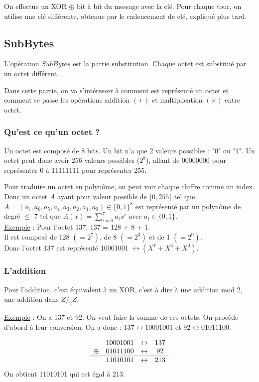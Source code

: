 On effectue un XOR $\oplus$ bit à bit du message avec la clé.
Pour chaque tour, on utilise une clé différente, obtenue par le cadencement de clé, expliqué plus tard.

\subsection{SubBytes}
L'opération $SubBytes$ est la partie substitution. Chaque octet est substitué par un octet différent. 

Dans cette partie, on va s'intéresser à comment est représenté un octet et comment se passe les opérations addition $(+)$ et multiplication $(\times)$ entre octet.

\subsubsection{Qu'est ce qu'un octet ?}
Un octet est composé de 8 bits. Un bit n'a que 2 valeurs possibles : "0" ou "1". Un octet peut donc avoir 256 valeurs possibles ($2^8$), allant de $00000000$ pour représenter 0 à $11111111$ pour représenter 255. 

Pour traduire un octet en polynôme, on peut voir chaque chiffre comme un index. 
Donc un octet $A$ ayant pour valeur possible de $\llbracket 0, 255 \rrbracket$ tel que $A = (a_7,a_6,a_5,a_4,a_3,a_2,a_1,a_0)\in\{0,1\}^8$ est représenté par un polynôme de degré $\leq$ 7 tel que $A(x) = \sum_{i=0}^7 a_i x^i$ avec $a_i\in \{0,1\}$. \\

\noindent \underline{Exemple} : Pour l'octet 137, 137 = 128 + 8 + 1. \\
Il est composé de 128 $(=2^7)$, de 8 $(=2^3)$ et de 1 $(=2^0)$. \\ 
Donc l'octet 137 est représenté 10001001 $\leftrightarrow (X^7 + X^3 + X^0)$.

\subsubsection{L'addition}
Pour l'addition, c'est équivalent à un XOR, c'est à dire à une addition mod 2, une addition dans $Z/_2Z$.

\noindent \underline{Exemple} : On a 137 et 92. On veut faire la somme de ces octets. On procède d'abord à leur conversion. On a donc : $137 \leftrightarrow 10001001$ et $92 \leftrightarrow 01011100$.

$$
\begin{array}{c c c c}
    & 10001001 & \leftrightarrow & 137 \\
    \oplus & 01011100 & \leftrightarrow & 92 \\
    \hline 
    & 11010101 & \leftrightarrow & 213\\
\end{array}
$$
On obtient 11010101 qui est égal à 213.

